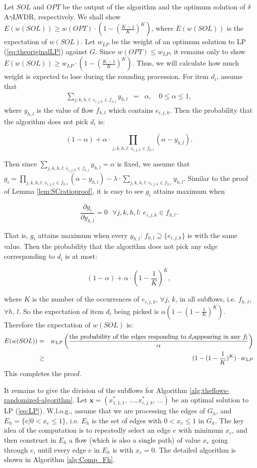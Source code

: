 \documentclass[11pt,english,onecolumn,draftcls]{IEEEtran}
\theoremstyle{plain}
\theoremstyle{plain}
\theoremstyle{plain}
\theoremstyle{plain}
\begin{document}
\begin{IEEEproof}
Let $SOL$ and $OPT$ be the output of the algorithm and the optimum
solution of $\delta$A$\gamma$LWDR, respectively. We shall show $E(w(SOL))\geq w(OPT)\cdot(1-(\frac{K-1}{K})^{K})$,
where $E(w(SOL))$ is the expectation of $w(SOL)$. Let $w_{LP}$
be the weight of an optimum solution to LP (\ref{eq:theoriginalLP})
against $G$. Since $w(OPT)\leq w_{LP}$, it remains only to show
$E(w(SOL))\geq w_{LP}\cdot(1-(\frac{K-1}{K})^{K})$. Thus, we will
calculate how much weight is expected to lose during the rounding
procession. For item $d_{i}$, assume that
\begin{eqnarray*}
\sum_{j,k,h,l:\, e_{i,j,k}\in f_{h,l}}y_{h,l} & = & \alpha,\,\,\,\,\,\,0\leq\alpha\leq1,
\end{eqnarray*}
where $y_{h,l}$ is the value of flow $f_{h,l}$ which contains $e_{i,j,k}$.
Then the probability that the algorithm does not pick $d_{i}$ is:

\[
(1-\alpha)+\alpha\cdot\prod_{j,k,h,l:\, e_{i,j,k}\in f_{h,l}}(\alpha-y_{h,l}).
\]


Then since $\sum_{j,k,h,l:\, e_{i,j,k}\in f_{h,l}}y_{h,l}=\alpha$
is fixed, we assume that $g_{i}=\prod_{j,k,h,l:\, e_{i,j,k}\in f_{h,l}}(\alpha-y_{h,l})-\lambda\cdot\sum_{j,k,h,l:\, e_{i,j,k}\in f_{h,l}}y_{h,l}$.
Similar to the proof of Lemma \ref{lem:SCratioproof}, it is easy
to see $g_{i}$ attains maximum when

\[
\frac{\partial g_{i}}{\partial y_{h,l}}=0\mbox{ }\forall j,k,h,l:\, e_{i,j,k}\in f_{h,l}.
\]


That is, $g_{i}$ attains maximum when every $y_{h,l}:\, f_{h,l}\supseteq\{e_{i,j,k}\}$
is with the same value. Then the probability that the algorithm does
not pick any edge corresponding to $d_{i}$ is at most:

\[
(1-\alpha)+\alpha\cdot(1-\frac{1}{K})^{K},
\]


where $K$ is the number of the occurrences of $e_{i,j,k}$, $\forall j,\, k$,
in all subflows, i.e. $f_{h,\, l}$, $\forall h,\, l$. So the expectation
of item $d_{i}$ being picked is $\alpha(1-(1-\frac{1}{K})^{K})$.
Therefore the expectation of $w(SOL)$ is:
\begin{eqnarray*}
E(w(SOL)) & = & w_{LP}\left(\frac{\mbox{the probability of the edges responding to \ensuremath{d_{i}}appearing in any }f_{l}}{\alpha}\right)\\
 & \geq & (1-(1-\frac{1}{K})^{K})\cdot w_{LP}
\end{eqnarray*}
This completes the proof.
\end{IEEEproof}
It remains to give the division of the subflows for Algorithm \ref{alg:theflows-randomized-algorithm}.
Let $\mathbf{x}=(x_{1,1,1}^{*},\,\dots,x_{i,j,k}^{*},\,\dots)$ be
an optimal solution to LP (\ref{eq:LP}). W.l.o.g., assume that we
are processing the edges of $G_{h}$, and $E_{h}=\{e\vert0<x_{e}\leq1\}$,
i.e. $E_{h}$ is the set of edges with $0<x_{e}\leq1$ in $G_{h}$.
The key idea of the computation is to repeatedly select an edge $e$
with minimum $x_{e}$, and then construct in $E_{h}$ a flow (which
is also a single path) of value $x_{e}$ going through $e$, until
every edge $e$ in $E_{h}$ is with $x_{e}=0$. The detailed algorithm
is shown in Algorithm \ref{alg:Comp_Fh}.
\end{document}
